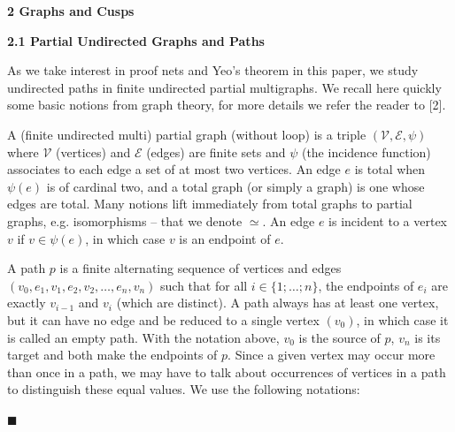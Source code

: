 
 
\par\medskip\noindent\textbf{2 Graphs and Cusps}\par
 
 
\par\medskip\noindent\textbf{2.1 Partial Undirected Graphs and Paths}\par
 
 
As we take interest in proof nets and Yeo’s theorem in this paper, we study undirected paths in finite undirected partial multigraphs. We recall here quickly some basic notions from graph theory, for more details we refer the reader to [2].\par
 
 
 
A (finite undirected multi) partial graph (without loop) is a triple $(\mathcal{V},\mathcal{E},\psi)$ where $\mathcal{V}$ (vertices) and $\mathcal{E}$ (edges) are finite sets and $\psi$ (the incidence function) associates to each edge a set of at most two vertices. An edge $e$ is total when $\psi(e)$ is of cardinal two, and a total graph (or simply a graph) is one whose edges are total. Many notions lift immediately from total graphs to partial graphs, e.g. isomorphisms – that we denote $\simeq$. An edge $e$ is incident to a vertex $v$ if $v\in\psi(e)$, in which case $v$ is an endpoint of $e$.\par
 
 
 
A path $p$ is a finite alternating sequence of vertices and edges $(v_{0},e_{1},v_{1},e_{2},v_{2},\dots,e_{n},v_{n})$ such that for all $i\in\{1;\dots;n\}$, the endpoints of $e_{i}$ are exactly $v_{i-1}$ and $v_{i}$ (which are distinct). A path always has at least one vertex, but it can have no edge and be reduced to a single vertex $(v_{0})$, in which case it is called an empty path. With the notation above, $v_{0}$ is the source of $p$, $v_{n}$ is its target and both make the endpoints of $p$. Since a given vertex may occur more than once in a path, we may have to talk about occurrences of vertices in a path to distinguish these equal values. We use the following notations:\par
  
\par\noindent  $\blacksquare$ 
 
